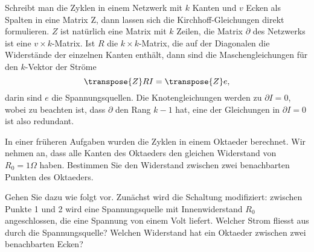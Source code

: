 Schreibt man die Zyklen in einem Netzwerk mit $k$ Kanten und $v$ Ecken
als Spalten in eine Matrix Z,
dann lassen sich die Kirchhoff-Gleichungen direkt formulieren.
$Z$ ist natürlich eine Matrix mit $k$ Zeilen, die Matrix $\partial$
des Netzwerks ist eine $v\times k$-Matrix.
Ist $R$ die $k\times k$-Matrix, die auf der Diagonalen die Widerstände der
einzelnen Kanten enthält, dann sind die Maschengleichungen für den
$k$-Vektor der Ströme 
\[
\transpose{Z}RI=\transpose{Z}e,
\]
darin sind $e$ die Spannungsquellen.
Die Knotengleichungen werden zu $\partial I=0$, wobei zu beachten ist,
dass $\partial$ den Rang $k-1$ hat, eine der Gleichungen in $\partial I=0$ 
ist also redundant.

In einer früheren Aufgaben wurden die Zyklen in einem Oktaeder berechnet.
Wir nehmen an, dass alle Kanten des Oktaeders den gleichen Widerstand von
$R_0=1\Omega$ haben. Bestimmen Sie den Widerstand zwischen zwei benachbarten
Punkten des Oktaeders.


\begin{hinweis}
Gehen Sie dazu wie folgt vor.
Zunächst wird die Schaltung modifiziert: zwischen Punkte 1 und 2 wird eine
Spannungsquelle mit Innenwiderstand $R_0$ angeschlossen,
die eine Spannung von einem Volt liefert.
Welcher Strom fliesst aus durch die Spannungsquelle? Welchen Widerstand
hat ein Oktaeder zwischen zwei benachbarten Ecken?
\end{hinweis}

